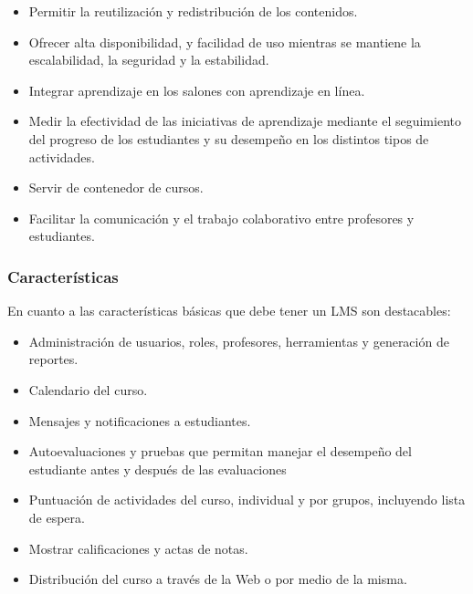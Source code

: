 \begin{itemize}
	\item Permitir la reutilización y redistribución de los contenidos.
	\item Ofrecer alta disponibilidad, y facilidad de uso mientras se mantiene la escalabilidad, la seguridad y la estabilidad.
	\item Integrar aprendizaje en los salones con aprendizaje en línea.
	\item Medir la efectividad de las iniciativas de aprendizaje mediante el seguimiento del progreso de los estudiantes y su desempeño en los distintos tipos de actividades. 
	\item Servir de contenedor de cursos.
	\item Facilitar la comunicación y el trabajo colaborativo entre profesores y estudiantes.
\end{itemize}
\citep{Hall2002}

\subsubsection {Características}
En cuanto a las características básicas que debe tener un LMS son destacables:

\begin{itemize}
	\item Administración de usuarios, roles, profesores, herramientas y generación de reportes.
	\item Calendario del curso.
	\item Mensajes y notificaciones a estudiantes.
	\item Autoevaluaciones y pruebas que permitan manejar el desempeño del estudiante antes y después de las evaluaciones
	\item Puntuación de actividades del curso, individual y por grupos, incluyendo lista de espera.
	\item Mostrar calificaciones y actas de notas.
	\item Distribución del curso a través de la Web o por medio de la misma.
\end{itemize}
\citep{Greenberg2002}